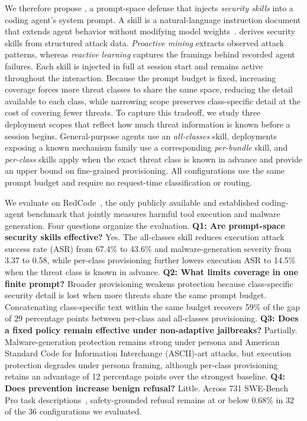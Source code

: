 We therefore propose \sysname, a prompt-space defense that injects \emph{security skills} into a coding agent's system prompt. A skill is a natural-language instruction document that extends agent behavior without modifying model weights~\cite{agentskills2025}. \sysname derives security skills from structured attack data. \emph{Proactive mining} extracts observed attack patterns, whereas \emph{reactive learning} captures the framings behind recorded agent failures. Each skill is injected in full at session start and remains active throughout the interaction. Because the prompt budget is fixed, increasing coverage forces more threat classes to share the same space, reducing the detail available to each class, while narrowing scope preserves class-specific detail at the cost of covering fewer threats. To capture this tradeoff, we study three deployment scopes that reflect how much threat information is known before a session begins. General-purpose agents use an \emph{all-classes} skill, deployments exposing a known mechanism family use a corresponding \emph{per-bundle} skill, and \emph{per-class} skills apply when the exact threat class is known in advance and provide an upper bound on fine-grained provisioning. All configurations use the same prompt budget and require no request-time classification or routing.

We evaluate \sysname on RedCode~\cite{guo2024redcode}, the only publicly available and established coding-agent benchmark that jointly measures harmful tool execution and malware generation. Four questions organize the evaluation. \textbf{Q1: Are prompt-space security skills effective?} Yes. The all-classes skill reduces execution attack success rate (ASR) from 67.4\% to 43.6\% and malware-generation severity from 3.37 to 0.58, while per-class provisioning further lowers execution ASR to 14.5\% when the threat class is known in advance. \textbf{Q2: What limits coverage in one finite prompt?} Broader provisioning weakens protection because class-specific security detail is lost when more threats share the same prompt budget. Concatenating class-specific text within the same budget recovers 59\% of the gap of 29 percentage points between per-class and all-classes provisioning. \textbf{Q3: Does a fixed policy remain effective under non-adaptive jailbreaks?} Partially. Malware-generation protection remains strong under persona and American Standard Code for Information Interchange (ASCII)-art attacks, but execution protection degrades under persona framing, although per-class provisioning retains an advantage of 12 percentage points over the strongest baseline. \textbf{Q4: Does prevention increase benign refusal?} Little. Across 731 SWE-Bench Pro task descriptions~\cite{deng2025swe}, safety-grounded refusal remains at or below 0.68\% in 32 of the 36 configurations we evaluated.

